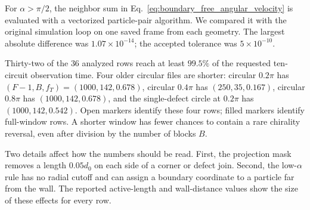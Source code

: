 \documentclass[11pt]{article}
\numberwithin{equation}{section}
\begin{document}
For $\alpha>\pi/2$, the neighbor sum in
Eq.~\eqref{eq:boundary_free_angular_velocity} is evaluated with a vectorized
particle-pair algorithm.  We compared it with the original simulation loop on
one saved frame from each geometry.  The largest absolute difference was
$1.07\times10^{-14}$; the accepted tolerance was $5\times10^{-10}$.

Thirty-two of the $36$ analyzed rows reach at least $99.5\%$ of the requested
ten-circuit observation time.  Four older circular files are shorter: circular
$0.2\pi$ has $(F-1,B,f_T)=(1000,142,0.678)$, circular $0.4\pi$ has
$(250,35,0.167)$, circular $0.8\pi$ has $(1000,142,0.678)$, and the
single-defect circle at $0.2\pi$ has $(1000,142,0.542)$.  Open markers identify
these four rows; filled markers identify full-window rows.  A shorter window
has fewer chances to contain a rare chirality reversal, even after division by
the number of blocks $B$.

Two details affect how the numbers should be read.  First, the projection mask
removes a length $0.05d_0$ on each side of a corner or defect join.  Second, the
low-$\alpha$ rule has no radial cutoff and can assign a boundary coordinate to
a particle far from the wall.  The reported active-length and wall-distance
values show the size of these effects for every row.

\begin{center}
\scriptsize
\setlength{\tabcolsep}{3.2pt}
\end{center}
\end{document}
